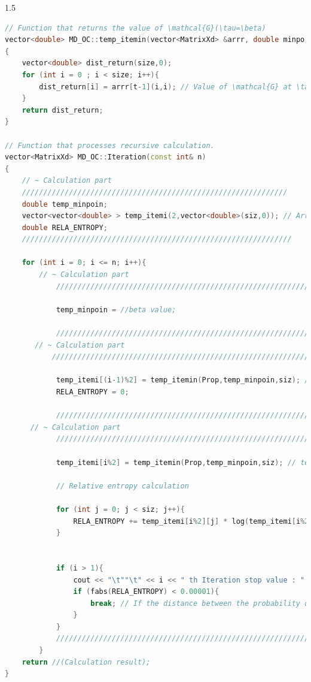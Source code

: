 \documentclass{article}[12pt]
\numberwithin{equation}{section}
\begin{document}
\begin{spacing}{1.5}
\begin{lstlisting}[language=C++, caption=Iteration truncation code]
// Function that returns the value of \mathcal{G}(\tau=\beta)
vector<double> MD_OC::temp_itemin(vector<MatrixXd> &arrr, double minpo, int size)
{
    vector<double> dist_return(size,0);
    for (int i = 0 ; i < size; i++){
        dist_return[i] = arrr[t-1](i,i); // Value of \mathcal{G} at \tau = \beta
    }
    return dist_return;
}

// Function that processes recursive calculation.
vector<MatrixXd> MD_OC::Iteration(const int& n)
{
    // ~ Calculation part
    //////////////////////////////////////////////////////////////
    double temp_minpoin;
    vector<vector<double> > temp_itemi(2,vector<double>(siz,0)); // Arrays to store the results of the previous and current iteration. siz represents the dimension of the calculated square matrix.
    double RELA_ENTROPY;
    ///////////////////////////////////////////////////////////////
    
    for (int i = 0; i <= n; i++){
        // ~ Calculation part
            //////////////////////////////////////////////////////////////////////////////

            temp_minpoin = //beta value; 

            //////////////////////////////////////////////////////////////////////////////
       // ~ Calculation part
           /////////////////////////////////////////////////////////////////////////////

            temp_itemi[(i-1)%2] = temp_itemin(Prop,temp_minpoin,siz); // temporary store previous iteration data
            RELA_ENTROPY = 0;

            ////////////////////////////////////////////////////////////////////////////
      // ~ Calculation part
            /////////////////////////////////////////////////////////////////////////////

            temp_itemi[i%2] = temp_itemin(Prop,temp_minpoin,siz); // temporary store present iteration data
            
            // Relative entropy calculation
            
            for (int j = 0; j < siz; j++){
                RELA_ENTROPY += temp_itemi[i%2][j] * log(temp_itemi[i%2][j]/temp_itemi[(i-1)%2][j]);
            }
            

            if (i > 1){
                cout << "\t""\t" << i << " th Iteration stop value : " << fabs(RELA_ENTROPY) << endl;
                if (fabs(RELA_ENTROPY) < 0.00001){
                    break; // If the distance between the probability distributions of the previous and current steps is less than 0.00001, the calculation is terminated.
                } 
            }
            /////////////////////////////////////////////////////////////////////////////
        }
    return //(Calculation result);
}
\end{lstlisting}

\end{spacing}
\end{document}
